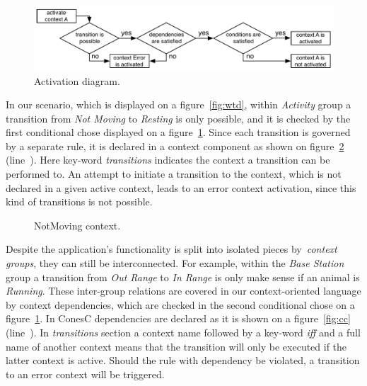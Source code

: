 \begin{figure}[!h]
\centering
\includegraphics[width=\columnwidth]{pdf/activation_diagram}
\caption{Activation diagram.}
\label{fig:ad}
\end{figure}

In our scenario, which is displayed on a figure~\ref{fig:wtd}, within \emph{Activity} group a
transition from \emph{Not Moving} to \emph{Resting} is only possible, and it is checked
by the first conditional chose displayed on a figure~\ref{fig:ad}.
Since each transition is governed by a separate rule, it is declared in a context component as shown
on figure~\ref{fig:nmc} (line~). Here key-word \emph{transitions} indicates the
context a transition can be performed to. An attempt to initiate
a transition to the context, which is not declared in a given active context, leads to an error context
activation, since this kind of transitions is not possible.


\begin{figure}[!h]
\TheSbox
\caption{NotMoving context.}
\label{fig:nmc}
\end{figure}

Despite the application's  functionality is split into isolated pieces by~\emph{context groups},
they can still be interconnected. For example, within the 
\emph{Base Station} group a transition from \emph{Out Range} to \emph{In Range} is only
make sense if an animal is \emph{Running}. These inter-group relations are covered in our
context-oriented language by context dependencies, which are checked in the second
conditional chose on a figure~\ref{fig:ad}. In ConesC dependencies are declared as it is shown on a
figure~\ref{fig:cc} (line~). In \emph{transitions} section a context name
followed by a key-word \emph{iff} and a full name of another context means that
the transition will only be executed if the latter context is active. Should the rule with dependency
be violated, a transition to an error context will be triggered.

